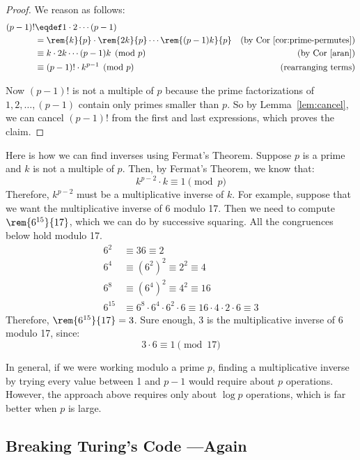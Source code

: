 \begin{proof}
We reason as follows:
\begin{align*}
(p-1)! &\eqdef 1 \cdot 2 \cdots (p-1)\\
       & = \rem{k}{p} \cdot \rem{2k}{p} \cdots \rem{(p-1)k}{p}
           & \text{(by Cor~\ref{cor:prime-permutes})}\\
       & \equiv k \cdot 2k \cdots (p-1) k \pmod{p}
           & \text{(by Cor~\ref{aran})}\\
       & \equiv (p-1)! \cdot k^{p-1} \pmod{p}
           & \text{(rearranging terms)}\\
\end{align*}

Now $(p - 1)!$ is not a multiple of $p$ because the prime
factorizations of $1, 2, \dots, (p - 1)$ contain only primes smaller
than $p$.  So by Lemma~\ref{lem:cancel}, we can cancel $(p - 1)!$ from
the first and last expressions, which proves the claim.
\end{proof}

Here is how we can find inverses using Fermat's Theorem.  Suppose $p$
is a prime and $k$ is not a multiple of $p$.  Then, by Fermat's
Theorem, we know that:
%
\[
k^{p-2} \cdot k \equiv 1 \pmod{p}
\]
%
Therefore, $k^{p-2}$ must be a multiplicative inverse of $k$.  For
example, suppose that we want the multiplicative inverse of 6 modulo
17.  Then we need to compute $\rem{6^{15}}{17}$, which we can do by
successive squaring.  All the congruences below hold modulo 17.
%
\begin{align*}
6^2 & \equiv 36 \equiv 2 \\
6^4 & \equiv (6^2)^2 \equiv 2^2 \equiv 4 \\
6^8 & \equiv (6^4)^2 \equiv 4^2 \equiv 16 \\
6^{15} & \equiv 6^8 \cdot 6^4 \cdot 6^2 \cdot 6
       \equiv 16 \cdot 4 \cdot 2 \cdot 6
       \equiv 3
\end{align*}
%
Therefore, $\rem{6^{15}}{17} = 3$.  Sure enough, 3 is the multiplicative
inverse of 6 modulo 17, since:
%
\[
3 \cdot 6 \equiv 1 \pmod{17}
\]

In general, if we were working modulo a prime $p$, finding a
multiplicative inverse by trying every value between 1 and $p - 1$
would require about $p$ operations.  However, the approach above
requires only about $\log p$ operations, which is far better when $p$
is large.

\subsection{Breaking Turing's Code ---Again}

